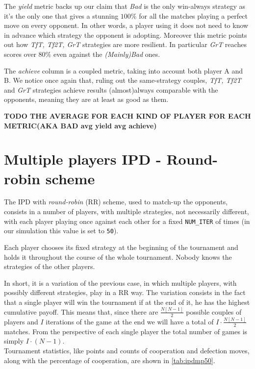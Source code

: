 \documentclass[journal,a4paper,10pt,twoside]{IEEEtran} %
\begin{document}
The \textit{yield} metric backs up our claim that \textit{Bad} is the only win-always strategy as it's the only one that gives a stunning $100\%$ for all the matches playing a perfect move on every opponent. In other words, a player using it does not need to know in advance which strategy the opponent is adopting. Moreover this metric points out how \textit{TfT, Tf2T, GrT} strategies are more resilient. In particular \textit{GrT} reaches scores over $80\%$ even against the \textit{(Mainly)Bad} ones.

The \textit{achieve} column is a coupled metric, taking into account both player A and B. We notice once again that, ruling out the same-strategy couples, \textit{TfT, Tf2T} and \textit{GrT} strategies achieve results (almost)always comparable with the opponents, meaning they are at least as good as them.

\textbf{TODO THE AVERAGE FOR EACH KIND OF PLAYER FOR EACH METRIC(AKA BAD avg yield avg achieve)}

\section{Multiple players IPD - Round-robin scheme} \label{s:IPDMP}
The IPD with \textit{round-robin} (RR) scheme, used to match-up the opponents, consists in a number of players, with multiple strategies, not necessarily different, with each player playing once against each other for a fixed \texttt{NUM\_ITER} of times (in our simulation this value is set to \texttt{50}).

Each player chooses its fixed strategy at the beginning of the tournament and holds it throughout the course of the whole tournament. Nobody knows the strategies of the other players.

In short, it is a variation of the previous case, in which multiple players, with possibly different strategies, play in a RR way. The variation consists in the fact that a single player will win the tournament if at the end of it, he has the highest cumulative payoff. This means that, since there are $\frac{N[N-1]}{2}$ possible couples of players and $I$ iterations of the game at the end we will have a total of $I\cdot\frac{N[N-1]}{2}$ matches. From the perspective of each single player the total number of games is simply $I\cdot(N-1)$.\\

Tournament statistics, like points and counts of cooperation and defection moves, along with the percentage of cooperation, are shown in \autoref{tab:ipdmp50}.
\end{document}
